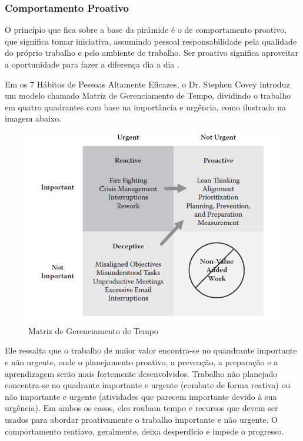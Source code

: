 \subsubsection[Comportamento Proativo]{Comportamento Proativo}

O princípio que fica sobre a base da pirâmide é o de comportamento proativo, que significa tomar iniciativa, assumindo pessoal responsabilidade pela qualidade do próprio trabalho e pelo ambiente de trabalho. Ser proativo significa aproveitar a oportunidade para fazer a diferença dia a dia \cite{bell2011}.

Em os 7 Hábitos de Pessoas Altamente Eficazes, o Dr. Stephen Covey introduz um modelo chamado Matriz de Gerenciamento de Tempo, dividindo o trabalho em quatro quadrantes com base na importância e urgência, como ilustrado na imagem abaixo.

\begin{figure}[h]
		\centering
		\label{fig03}
			\includegraphics[scale=0.9]{figuras/matrizcomportamento.png}
		\caption{Matriz de Gerenciamento de Tempo \cite{bell2011}}
\end{figure}

Ele ressalta que o trabalho de maior valor encontra-se no quandrante importante e não urgente, onde o planejamento proativo, a prevenção, a preparação e a aprendizagem serão mais fortemente desenvolvidos. Trabalho não planejado concentra-se no quadrante importante e urgente (combate de forma reativa) ou não importante e urgente (atividades que parecem importante devido à sua urgência). Em ambos os casos, eles roubam tempo e recursos que devem ser usados para abordar proativamente o trabalho importante e não urgente. O comportamento reatiavo, geralmente, deixa desperdício e impede o progresso. 

